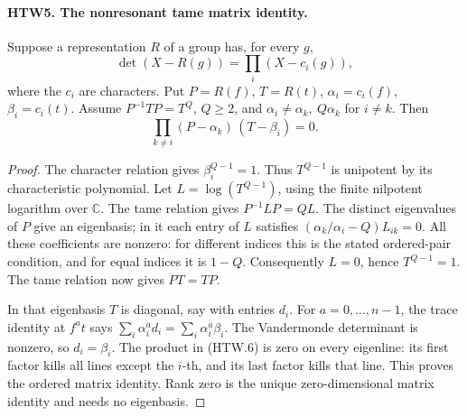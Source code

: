 \documentclass[11pt,a4paper]{article}
\numberwithin{equation}{section}
\theoremstyle{remark}\newtheorem{remark}[theorem]{Remark}
\begin{document}
\paragraph{HTW5. The nonresonant tame matrix identity.}
\label{claim:HTW5}
Suppose a representation \(R\) of a group has, for every \(g\),
\[
 \det(X-R(g))=\prod_i(X-c_i(g)),
\]
where the \(c_i\) are characters.  Put \(P=R(f)\), \(T=R(t)\),
\(\alpha_i=c_i(f)\), \(\beta_i=c_i(t)\).  Assume
\(P^{-1}TP=T^Q\), \(Q\ge2\), and
\(\alpha_i\ne\alpha_k,\ Q\alpha_k\) for \(i\ne k\).
Then
\[
 \prod_{k\ne i}(P-\alpha_k)\,(T-\beta_i)=0 .
 \tag{HTW.6}
\]
\begin{proof}
The character relation gives \(\beta_i^{Q-1}=1\).
Thus \(T^{Q-1}\) is unipotent by its characteristic
polynomial.  Let \(L=\log(T^{Q-1})\), using the finite
nilpotent logarithm over \(\mathbb C\).  The tame relation
gives \(P^{-1}LP=QL\).  The distinct eigenvalues of \(P\)
give an eigenbasis; in it each entry of \(L\) satisfies
\((\alpha_k/\alpha_i-Q)L_{ik}=0\).  All these coefficients
are nonzero: for different indices this is the stated
ordered-pair condition, and for equal indices it is
\(1-Q\).  Consequently \(L=0\), hence \(T^{Q-1}=1\).
The tame relation now gives \(PT=TP\).

In that eigenbasis \(T\) is diagonal, say with entries
\(d_i\).  For \(a=0,\ldots,n-1\), the trace identity at
\(f^at\) says
\(\sum_i\alpha_i^a d_i=\sum_i\alpha_i^a\beta_i\).
The Vandermonde determinant is nonzero, so \(d_i=\beta_i\).
The product in (HTW.6) is zero on every eigenline: its
first factor kills all lines except the \(i\)-th, and its
last factor kills that line.  This proves the ordered
matrix identity.  Rank zero is the unique zero-dimensional
matrix identity and needs no eigenbasis.
\end{proof}

\end{document}
